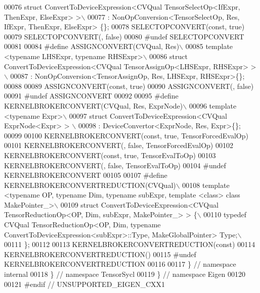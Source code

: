 \begin{DoxyCode}
00076 \textcolor{preprocessor}{struct ConvertToDeviceExpression<CVQual TensorSelectOp<IfExpr, ThenExpr, ElseExpr> >\(\backslash\)}
00077 \textcolor{preprocessor}{: NonOpConversion<TensorSelectOp, Res, IfExpr, ThenExpr, ElseExpr> \{\};}
00078 SELECTOPCONVERT(\textcolor{keyword}{const}, \textcolor{keyword}{true})
00079 SELECTOPCONVERT(, false)
00080 \textcolor{preprocessor}{#undef SELECTOPCONVERT}
00081 
00084 \textcolor{preprocessor}{#define ASSIGNCONVERT(CVQual, Res)\(\backslash\)}
00085 \textcolor{preprocessor}{template <typename LHSExpr, typename RHSExpr>\(\backslash\)}
00086 \textcolor{preprocessor}{struct ConvertToDeviceExpression<CVQual TensorAssignOp<LHSExpr, RHSExpr> >\(\backslash\)}
00087 \textcolor{preprocessor}{: NonOpConversion<TensorAssignOp, Res, LHSExpr, RHSExpr>\{\};}
00088 
00089 ASSIGNCONVERT(\textcolor{keyword}{const}, \textcolor{keyword}{true})
00090 ASSIGNCONVERT(, false)
00091 \textcolor{preprocessor}{#undef ASSIGNCONVERT}
00092 
00095 \textcolor{preprocessor}{#define KERNELBROKERCONVERT(CVQual, Res, ExprNode)\(\backslash\)}
00096 \textcolor{preprocessor}{template <typename Expr>\(\backslash\)}
00097 \textcolor{preprocessor}{struct ConvertToDeviceExpression<CVQual ExprNode<Expr> > \(\backslash\)}
00098 \textcolor{preprocessor}{: DeviceConvertor<ExprNode, Res, Expr>\{\};}
00099 
00100 KERNELBROKERCONVERT(\textcolor{keyword}{const}, \textcolor{keyword}{true}, TensorForcedEvalOp)
00101 KERNELBROKERCONVERT(, \textcolor{keyword}{false}, TensorForcedEvalOp)
00102 KERNELBROKERCONVERT(\textcolor{keyword}{const}, \textcolor{keyword}{true}, TensorEvalToOp)
00103 KERNELBROKERCONVERT(, \textcolor{keyword}{false}, TensorEvalToOp)
00104 \textcolor{preprocessor}{#undef KERNELBROKERCONVERT}
00105 
00107 \textcolor{preprocessor}{#define KERNELBROKERCONVERTREDUCTION(CVQual)\(\backslash\)}
00108 \textcolor{preprocessor}{template <typename OP, typename Dim, typename subExpr, template <class> class MakePointer\_>\(\backslash\)}
00109 \textcolor{preprocessor}{struct ConvertToDeviceExpression<CVQual TensorReductionOp<OP, Dim, subExpr, MakePointer\_> > \{\(\backslash\)}
00110 \textcolor{preprocessor}{  typedef CVQual TensorReductionOp<OP, Dim, typename ConvertToDeviceExpression<subExpr>::Type,
       MakeGlobalPointer> Type;\(\backslash\)}
00111 \textcolor{preprocessor}{\};}
00112 
00113 KERNELBROKERCONVERTREDUCTION(\textcolor{keyword}{const})
00114 KERNELBROKERCONVERTREDUCTION()
00115 \textcolor{preprocessor}{#undef KERNELBROKERCONVERTREDUCTION}
00116 
00117 \}  \textcolor{comment}{// namespace internal}
00118 \}  \textcolor{comment}{// namespace TensorSycl}
00119 \}  \textcolor{comment}{// namespace Eigen}
00120 
00121 \textcolor{preprocessor}{#endif  // UNSUPPORTED\_EIGEN\_CXX1}
\end{DoxyCode}
